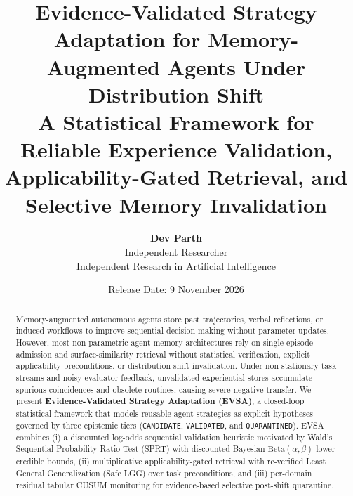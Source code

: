 \documentclass[10pt,letterpaper]{article}
\title{\vspace{-1.1em}\textbf{\Large Evidence-Validated Strategy Adaptation for Memory-Augmented Agents Under Distribution Shift}\\[0.4em]
\large\textcolor{slateDark}{A Statistical Framework for Reliable Experience Validation, Applicability-Gated Retrieval, and Selective Memory Invalidation}}
\author{
  \textbf{Dev Parth}\\
  \small Independent Researcher\\
  \small Independent Research in Artificial Intelligence
}
\date{\small Release Date: 9 November 2026}
\begin{document}
\maketitle
\thispagestyle{fancy}

\begin{abstract}
\noindent Memory-augmented autonomous agents store past trajectories, verbal reflections, or induced workflows to improve sequential decision-making without parameter updates. However, most non-parametric agent memory architectures rely on single-episode admission and surface-similarity retrieval without statistical verification, explicit applicability preconditions, or distribution-shift invalidation. Under non-stationary task streams and noisy evaluator feedback, unvalidated experiential stores accumulate spurious coincidences and obsolete routines, causing severe negative transfer. We present \textbf{Evidence-Validated Strategy Adaptation (EVSA)}, a closed-loop statistical framework that models reusable agent strategies as explicit hypotheses governed by three epistemic tiers (\texttt{CANDIDATE}, \texttt{VALIDATED}, and \texttt{QUARANTINED}). EVSA combines (i) a discounted log-odds sequential validation heuristic motivated by Wald's Sequential Probability Ratio Test (SPRT) with discounted Bayesian $\mathrm{Beta}(\alpha,\beta)$ lower credible bounds, (ii) multiplicative applicability-gated retrieval with re-verified Least General Generalization (Safe LGG) over task preconditions, and (iii) per-domain residual tabular CUSUM monitoring for evidence-based selective post-shift quarantine.


\end{abstract}
\end{document}
